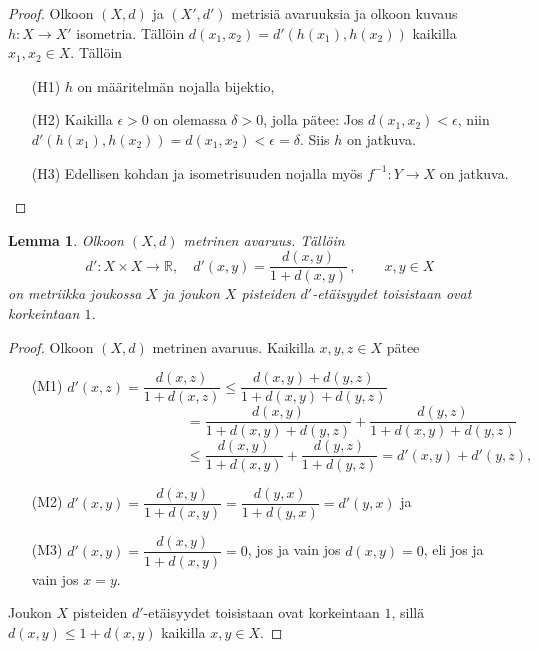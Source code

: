 \documentclass[12pt,a4paper,leqno]{report}
\newcommand{\R}{\mathbb{R}}
\theoremstyle{plain}
\newtheorem{lem}[equation]{Lemma}
\theoremstyle{definition}
\theoremstyle{remark}
\begin{document}
\begin{proof}
Olkoon $(X,d)$ ja $(X',d')$ metrisiä avaruuksia ja olkoon kuvaus $h\colon X\rightarrow X'$ isometria. Tällöin $d(x_1,x_2)=d'(h(x_1),h(x_2))$ kaikilla $x_1,x_2 \in X$. Tällöin
\begin{itemize}
\item[(H1)] $h$ on määritelmän nojalla bijektio,
\item[(H2)] Kaikilla $\epsilon>0$ on olemassa $\delta>0$, jolla pätee: Jos $d(x_1,x_2)<\epsilon$, niin $d'(h(x_1),h(x_2))=d(x_1,x_2)<\epsilon=\delta$. Siis $h$ on jatkuva.
\item[(H3)] Edellisen kohdan ja isometrisuuden nojalla myös $f^{-1} \colon Y\rightarrow X$ on jatkuva. 
\end{itemize}
\end{proof}
\begin{lem}\label{rajmetri} Olkoon $(X,d)$ metrinen avaruus. Tällöin
$$d'\colon X\times X \rightarrow \R,\quad d'(x,y)=\dfrac{d(x,y)}{1+d(x,y)} \, , \qquad x,y\in X$$
on metriikka joukossa $X$ ja joukon $X$ pisteiden $d'$-etäisyydet toisistaan ovat korkeintaan $1$.
\end{lem}
\begin{proof}
Olkoon $(X,d)$ metrinen avaruus. Kaikilla $x,y,z\in X$ pätee
\begin{itemize}
\item[(M1)]$d'(x,z)=\dfrac{d(x,z)}{1+d(x,z)}
\leq \dfrac{d(x,y)+d(y,z)}{1+d(x,y)+d(y,z)}$\\
$\phantom{d'(x,z)=\dfrac{d(x,z)}{1+d(x,z)}}
= \dfrac{d(x,y)}{1+d(x,y)+d(y,z)}+ \dfrac{d(y,z)}{1+d(x,y)+d(y,z)}$\\
$\phantom{d'(x,z)=\dfrac{d(x,z)}{1+d(x,z)}}
\leq \dfrac{d(x,y)}{1+d(x,y)}+ \dfrac{d(y,z)}{1+d(y,z)}=d'(x,y)+d'(y,z),$
\item[(M2)]$d'(x,y)=\dfrac{d(x,y)}{1+d(x,y)}
=\dfrac{d(y,x)}{1+d(y,x)}=d'(y,x)$ ja
\item[(M3)]$d'(x,y)=\dfrac{d(x,y)}{1+d(x,y)}=0$, jos ja vain jos $d(x,y)=0$, eli jos ja vain jos $x=y$.
\end{itemize} 
Joukon $X$ pisteiden $d'$-etäisyydet toisistaan ovat korkeintaan $1$, sillä $d(x,y)\leq 1+d(x,y)$ kaikilla $x,y\in X$.
\end{proof}

\end{document}
